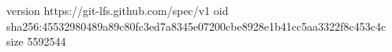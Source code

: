 version https://git-lfs.github.com/spec/v1
oid sha256:45532980489a89c80fc3ed7a8345e07200cbe8928e1b41cc5aa3322f8c453c4c
size 5592544
